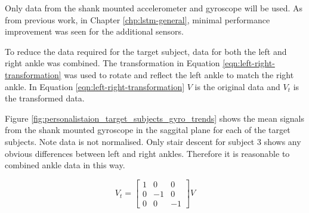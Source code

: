 Only data from the shank mounted accelerometer and gyroscope will be used. As from previous work, in Chapter \ref{chp:lstm-general}, minimal performance improvement was seen for the additional sensors. 

To reduce the data required for the target subject, data for both the left and right ankle was combined. The transformation in Equation \ref{eqn:left-right-transformation} was used to rotate and reflect the left ankle to match the right ankle. In Equation \ref{eqn:left-right-transformation} $V$ is the original data and $V_t$ is the transformed data. 

Figure \ref{fig:personalistaion_target_subjects_gyro_trends} shows the mean signals from the shank mounted gyroscope in the saggital plane for each of the target subjects. Note data is not normalised. Only stair descent for subject 3 shows any obvious differences between left and right ankles. Therefore it is reasonable to combined ankle data in this way.

\begin{equation}
    V_t = \begin{bmatrix}
    1 & 0 & 0 \\
    0 & -1 & 0 \\
    0 & 0 & -1
    \end{bmatrix} V
\label{eqn:left-right-transformation}
\end{equation}

